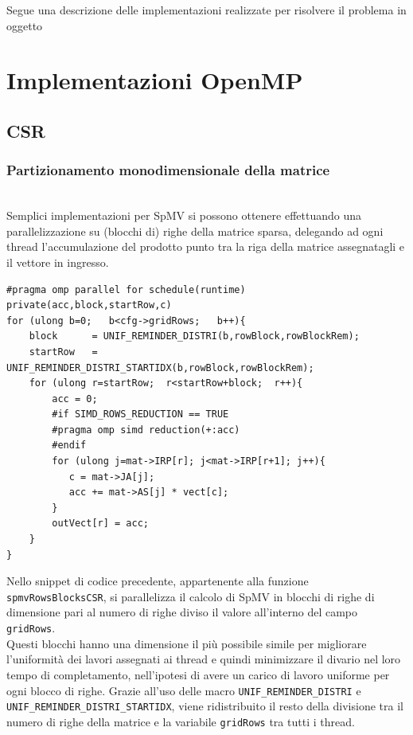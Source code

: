 \documentclass[acmsmall,nonacm=true]{acmart}
\newcommand{\vvv}[1]{{\small\texttt{#1}}}
\begin{document}
Segue una descrizione delle implementazioni realizzate per risolvere
il problema in oggetto

\section{Implementazioni OpenMP}
\subsection{CSR}
\subsubsection{Partizionamento monodimensionale della matrice}\hfill\\	%
Semplici implementazioni per SpMV si possono ottenere effettuando una
parallelizzazione su (blocchi di) righe della matrice sparsa, 
delegando ad ogni thread l'accumulazione del prodotto punto tra 
la riga della matrice assegnatagli e il vettore in ingresso.
\label{spmvRowsBlocksCSR}
\begin{lstlisting} 
#pragma omp parallel for schedule(runtime) private(acc,block,startRow,c)
for (ulong b=0;   b<cfg->gridRows;   b++){
    block      = UNIF_REMINDER_DISTRI(b,rowBlock,rowBlockRem);
    startRow   = UNIF_REMINDER_DISTRI_STARTIDX(b,rowBlock,rowBlockRem);
    for (ulong r=startRow;  r<startRow+block;  r++){
        acc = 0;
        #if SIMD_ROWS_REDUCTION == TRUE
        #pragma omp simd reduction(+:acc)
        #endif
        for (ulong j=mat->IRP[r]; j<mat->IRP[r+1]; j++){
           c = mat->JA[j];
           acc += mat->AS[j] * vect[c];
        }
        outVect[r] = acc;
    } 
}
\end{lstlisting}
Nello snippet di codice precedente, appartenente alla funzione \vvv{spmvRowsBlocksCSR},
si parallelizza il calcolo di SpMV in blocchi
di righe di dimensione pari al numero di righe diviso il valore 
all'interno del campo \vvv{gridRows}.\\
\label{UNIF_REMINDER_DISTRI}
Questi blocchi hanno una dimensione il più possibile simile per migliorare
l'uniformità dei lavori assegnati ai thread e quindi minimizzare il divario nel
loro tempo di completamento, nell'ipotesi di avere un carico di lavoro uniforme per ogni
blocco di righe.
Grazie all'uso delle macro \vvv{UNIF\_REMINDER\_DISTRI} e \vvv{UNIF\_REMINDER\_DISTRI\_STARTIDX},
viene ridistribuito il resto della divisione tra il numero di righe della
matrice e la variabile \vvv{gridRows} tra tutti i thread.\\
\end{document}
